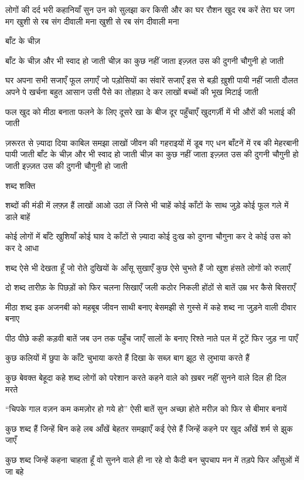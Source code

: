 लोगों की दर्द भरी कहानियाँ
सुन उन को सुलझा
कर किसी और का घर रौशन
खुद रब करें तेरा घर जग मग
खुशी से रब संग दीवाली मना
खुशी से रब संग दीवाली मना


बाँट के चीज़ 

बाँट के चीज़ और भी स्वाद हो जाती
चीज़ का कुछ नहीं जाता
इज़्ज़त उस की दुगनी चौगुनी हो जाती

घर अपना सभी सजाएँ फूल लगाएँ
जो पड़ोसियों का संवारें सजाएँ
इस से बड़ी ख़ुशी पायी नहीं जाती
दौलत अपने पे खर्चना बहुत आसान
उसी पैसे का तोहफ़ा दे कर 
लाखों बच्चों की भूख मिटाई जाती

फल खुद को मीठा बनाता फलने के लिए
दूसरे खा के बीज दूर पहुँचाएँ
खुदगर्ज़ी में भी औरों की भलाई की जाती

ज़रूरत से ज़्यादा दिया काबिल समझा
लाखों जीवन की गहराइयों में डूब गए
धन बाँटनें में रब की मेहरबानी पायी जाती
बाँट के चीज़ और भी स्वाद हो जाती
चीज़ का कुछ नहीं जाता
इज़्ज़त उस की दुगनी चौगुनी हो जाती
इज़्ज़त उस की दुगनी चौगुनी हो जाती

शब्द शक्ति

शब्दों की मंडी में लफ़्ज़ हैं लाखों
आओ उठा लें जिसे भी चाहें
कोई काँटों के साथ जुड़े
कोई फूल गले में डाले बाहें





कोई लोगों में बाँटे खुशियाँ
कोई घाव दे काँटों से ज़्यादा
कोई दुःख को दुगना चौगुना कर दे
कोई उस को कर दे आधा

शब्द ऐसे भी देखता हूँ जो
रोते दुखियों के आँसू सुखाएँ
कुछ ऐसे चुभते हैं जो
खुश हंसते लोगों को रुलाएँ


दो शब्द तारीफ़ के पिछड़ों को
फिर चलना सिखाएँ
जली कठोर निकली होंठों से बातें
उम्र भर कैसे बिसराएँ

मीठा शब्द इक अजनबी को
महबूब जीवन साथी बनाए
बेसमझी से गुस्से में कहे शब्द
ना जुड़ने वाली दीवार बनाए


पीठ पीछे कही कड़वी बातें
जब उन तक पहुँच जाएँ
सालों के बनाए रिश्ते नाते
पल में टूटें फिर जुड़ ना पाएँ

कुछ कलियों में छुपा के
काँटे चुभाया करते हैं
दिखा के सब्ज़ बाग
झूठ से लुभाया करते हैं


कुछ बेवक्त बेहूदा कहे शब्द
लोगों को परेशान करते
कहने वाले को ख़बर नहीं
सुनने वाले दिल ही दिल मरते

“चिपके गाल वज़न कम
कमज़ोर हो गये हो”
ऐसी बातें सुन अच्छा होते
मरीज़ को फिर से बीमार बनायें

कुछ शब्द हैं जिन्हें बिन कहे
लब आँखें बेहतर समझाएँ
कई ऐसे हैं जिन्हें कहने पर
खुद आँखें शर्म से झुक जाएँ

कुछ शब्द जिन्हें कहना चाहता हूँ
वो सुनने वाले ही ना रहे
वो कैदी बन चुपचाप मन में तड़पे
फिर आँसुओं में जा बहे







